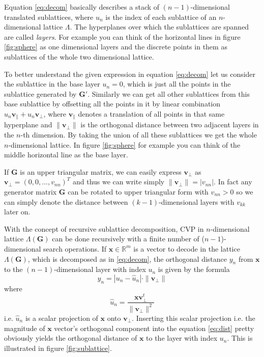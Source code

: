 \documentclass[english,12pt,a4paper,pdftex,sci,utf8]{aaltothesis}
\begin{document}
\noindent Equation \eqref{eq:decom} basically describes a stack of $(n-1)$-dimensional translated sublattices, where $u_n$ is the index of each sublattice of an $n$-dimensional lattice $\Lambda$. The hyperplanes over which the sublattices are spanned are called \textit{layers}. For example you can think of the horizontal lines in figure \ref{fig:sphere} as one dimensional layers and the discrete points in them as sublattices of the whole two dimensional lattice.
\par To better understand the given expression in equation \eqref{eq:decom} let us consider the sublattice in the base layer $u_n = 0$, which is just all the points in the sublattice generated by $\mathbf{G}'$. Similarly we can get all other sublattices from this base sublattice by offsetting all the points in it by linear combination $u_n\mathbf{v}_{\parallel}+u_n\mathbf{v}_{\bot}$, where $\mathbf{v}_{\parallel}$ denotes a translation of all points in that same hyperplane and $\|\mathbf{v}_{\bot}\|$ is the orthogonal distance between two adjacent layers in the $n$-th dimension. By taking the union of all these sublattices we get the whole $n$-dimensional lattice. In figure \ref{fig:sphere} for example you can think of the middle horizontal line as the base layer.
\par If $\mathbf{G}$ is an upper triangular matrix, we can easily express $\mathbf{v}_{\bot}$ as $\mathbf{v}_{\bot} = (0, 0, ..., v_{nn})^T$ and thus we can write simply $\|\mathbf{v}_{\bot}\| = |v_{nn}|$. In fact any generator matrix $\mathbf{G}$ can be rotated to upper triangular form \cite{agrell} with $v_{nn} > 0$ so we can simply denote the distance between $(k-1)$-dimensional layers with $v_{kk}$ later on.
\par With the concept of recursive sublattice decomposition, CVP in $n$-dimensional lattice $\Lambda(\mathbf{G})$ can be done recursively with a finite number of ($n-1$)-dimensional search operations. If $\mathbf{x} \in \mathbb{R}^m$ is a vector to decode in the lattice $\Lambda(\mathbf{G})$, which is decomposed as in \eqref{eq:decom}, the orthogonal distance $y_n$ from $\mathbf{x}$ to the $(n-1)$-dimensional layer with index $u_n$ is given by the formula
\begin{equation}
y_n = |u_n-\hat{u}_n| \cdot \|\mathbf{v}_{\bot}\|
\label{eq:dist}
\end{equation}
where
\begin{equation}
\hat{u}_n = \frac{\mathbf{xv}_{\bot}^t}{\|\mathbf{v}_{\bot}\|^2}
\label{eq:uhat}
\end{equation}
i.e. $\hat{u}_n$ is a scalar projection of $\mathbf{x}$ onto $\mathbf{v}_{\bot}$. %
Inserting this scalar projection i.e. the magnitude of $\mathbf{x}$ vector's orthogonal component %
into the equation \eqref{eq:dist} pretty obviously yields the orthogonal distance of $\mathbf{x}$ to the layer with index $u_n$. This is illustrated in figure \ref{fig:sublattice}.
\end{document}
